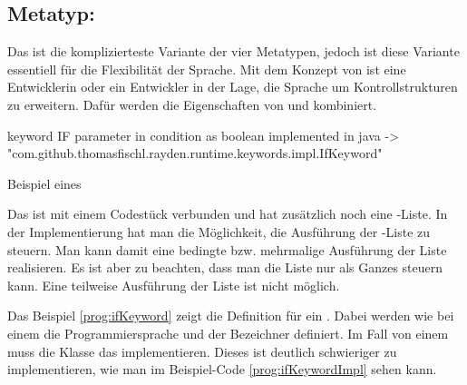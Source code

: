 
\subsection{Metatyp: }

Das  ist die komplizierteste Variante der vier Metatypen, jedoch ist diese Variante essentiell für die Flexibilität der Sprache. Mit dem Konzept von  ist eine Entwicklerin oder ein Entwickler in der Lage, die Sprache um Kontrollstrukturen zu erweitern. Dafür werden die Eigenschaften von  und  kombiniert. 

\begin{program}
\begin{JavaCode}
keyword IF { 
	parameter in condition as boolean
	implemented in java -> "com.github.thomasfischl.rayden.runtime.keywords.impl.IfKeyword"
}
\end{JavaCode}
\caption{Beispiel eines }
\label{prog:ifKeyword}
\end{program}

\SuperPar
Das  ist mit einem Codestück verbunden und hat zusätzlich noch eine -Liste. In der Implementierung hat man die Möglichkeit, die Ausführung der -Liste zu steuern. Man kann damit eine bedingte bzw. mehrmalige Ausführung der Liste realisieren. Es ist aber zu beachten, dass man die Liste nur als Ganzes steuern kann. Eine teilweise Ausführung der Liste ist nicht möglich.

\SuperPar
Das Beispiel \ref{prog:ifKeyword} zeigt die Definition für ein . Dabei werden wie bei einem  die Programmiersprache und der Bezeichner definiert. Im Fall von einem  muss die Klasse das   implementieren. Dieses  ist deutlich schwieriger zu implementieren, wie man im Beispiel-Code \ref{prog:ifKeywordImpl} sehen kann.

